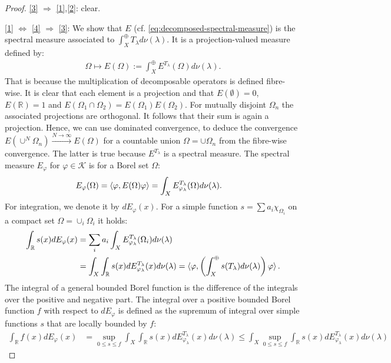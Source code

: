 \documentclass[12pt]{article}
\def\RR{{\mathbb R}}
\def\K{{\mathcal K}}
\def\l{\lambda}
\theoremstyle{remark}
\begin{document}
		\begin{proof}
			\ref{3} $\Rightarrow$ \ref{1},\ref{2}: clear.
			
			\ref{1} $\Leftrightarrow$ \ref{4} $\Rightarrow$ \ref{3}:
			We show that $E$ (cf.\! \eqref{eq:decomposed-spectral-measure}) is the spectral measure associated to $\int^\oplus_X T_\l d\nu(\l)$. It is a projection-valued measure defined by:
				\begin{align*}
					\Omega \mapsto E(\Omega):=\int^\oplus_X E^{T_\l}(\Omega)d\nu(\l).
				\end{align*}
			That is because the multiplication of decomposable operators is defined fibre-wise. It is clear that each element is a projection and that $E(\emptyset)=0$, $E(\RR)=1$ and $E(\Omega_1 \cap \Omega_2)=E(\Omega_1)E(\Omega_2)$.
			For mutually disjoint $\Omega_n$ the associated projections are orthogonal. It follows that their sum is again a projection. Hence, we can use dominated convergence, to deduce the convergence $E(\cup^N \Omega_n)\xrightarrow{N\rightarrow \infty}E(\Omega)$ for a countable union $\Omega=\cup \Omega_n$ from the fibre-wise convergence. The latter is true because $E^{T_\l}$ is a spectral measure.
			The spectral measure $E_\varphi$ for $\varphi\in \K$ is for a Borel set $\Omega$:
				\begin{align*}
					E_\varphi(\Omega)=\braket{\varphi,E(\Omega)\varphi}
					&=\int_X E^{T_\l}_{\varphi_\l}(\Omega) d\nu(\l).
				\end{align*}
			For integration, we denote it by $dE_\varphi(x)$. For a simple
			function $s=\sum a_i \chi_{\Omega_i}$ on a compact set $\Omega=\cup_{i} \Omega_i$ it holds:
				\begin{align*}
					\int_\RR s(x) dE_\varphi(x)&=\sum\limits_{i}a_i\int_X E_{\varphi_\l}^{T_\l}(\Omega_i)d\nu(\l)\\
					&=\int_X \int_\RR  s(x) dE^{T_\l}_{\varphi_\l}(x) 	d\nu(\l)=\braket{\varphi,\left(\int^\oplus_X s(T_\l)d\nu(\l)\right) \varphi}.
				\end{align*}
			The integral of a general bounded Borel function is the difference of the integrals over the positive and negative part.
			The integral over a positive bounded Borel function $f$ with respect to $dE_\varphi$ is defined as the supremum of integral over simple functions $s$ that are locally bounded by $f$:
				\begin{align*}
					\int_\RR f(x) dE_\varphi(x)&=\sup\limits_{0\leq s\leq f}\int_X \int_\RR s(x) dE^{T_\l}_{\varphi_\l}(x) d\nu(\l)\leq \int_X \sup\limits_{0\leq s\leq f}\int_\RR s(x) dE^{T_\l}_{\varphi_\l}(x) d\nu(\l)

\end{align*}
\end{proof}
\end{document}
